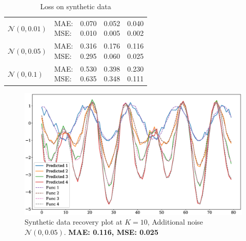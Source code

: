 \documentclass{article}
\begin{document}
{\begin{table}[!h]
\def\arraystretch{2.3}
\begin{center}
\caption{Loss on synthetic data}
\begin{tabular}{|l||l||*{3}{c|}}\hline
	\backslashbox{Noise}{Parameters}
	&\makebox[3em]{Metric}&\makebox[3em]{$K=2$}&\makebox[3em]{$K=4$}&\makebox[3em]{$K=10$}\\\hline
	$\mathcal{N}(0, 0.01)$&\makecell{ MAE: \\ MSE: } &\makecell{ 0.070 \\ 0.010 }&\makecell{ 0.052 \\ 0.005 }&\makecell{ 0.040 \\ 0.002 }\\\hline
	$\mathcal{N}(0, 0.05)$&\makecell{ MAE: \\ MSE: } &\makecell{ 0.316 \\ 0.295 }&\makecell{ 0.176 \\ 0.060 }&\makecell{ 0.116 \\ 0.025 }\\\hline
	$\mathcal{N}(0, 0.1)$& \makecell{ MAE: \\ MSE: } &\makecell{ 0.530 \\ 0.635 }&\makecell{ 0.398 \\ 0.348 }&\makecell{ 0.230 \\ 0.111 }\\\hline
\end{tabular}
\end{center}
\end{table}


\begin{figure}[H]
	\centering
	\includegraphics[width=\textwidth]{synthetic_time_series_K10N005.eps}
	\caption{Synthetic data recovery plot at $K=10$, Additional noise $\mathcal{N}(0, 0.05)$. \textbf{MAE: 0.116, MSE: 0.025}}
	\label{fig:fig6}
\end{figure}

}
\end{document}

